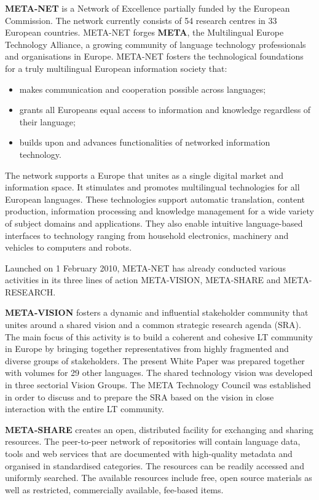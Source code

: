 \begin{multicols}{2}

\textbf{META-NET} is a Network of Excellence partially funded by the
European Commission. The network currently consists of 54 research
centres in 33 European countries. META-NET forges \textbf{META}, the
Multilingual Europe Technology Alliance, a growing community of
language technology professionals and organisations in Europe.
META-NET fosters the technological foundations for a truly
multilingual European information society that:
\begin{itemize}
\item	makes communication and cooperation possible across languages;
\item grants all Europeans equal access to information and knowledge
  regardless of their language;
\item builds upon and advances functionalities of networked
  information technology.
\end{itemize}

The network supports a Europe that unites as a single digital market
and information space. It stimulates and promotes multilingual
technologies for all European languages. These technologies support
automatic translation, content production, information processing and
knowledge management for a wide variety of subject domains and
applications. They also enable intuitive language-based interfaces to
technology ranging from household electronics, machinery and vehicles
to computers and robots.

Launched on 1 February 2010, META-NET has already conducted various
activities in its three lines of action META-VISION, META-SHARE and
META-RESEARCH.

\textbf{META-VISION} fosters a dynamic and influential stakeholder
community that unites around a shared vision and a common strategic
research agenda (SRA). The main focus of this activity is to build a
coherent and cohesive LT community in Europe by bringing together
representatives from highly fragmented and diverse groups of
stakeholders. The present White Paper was prepared together with
volumes for 29 other languages. The shared technology vision was
developed in three sectorial Vision Groups. The META Technology
Council was established in order to discuss and to prepare the SRA
based on the vision in close interaction with the entire LT community.

\textbf{META-SHARE} creates an open, distributed facility for
exchanging and sharing resources. The peer-to-peer network of
repositories will contain language data, tools and web services that
are documented with high-quality metadata and organised in
standardised categories. The resources can be readily accessed and
uniformly searched. The available resources include free, open source
materials as well as restricted, commercially available, fee-based
items.


\end{multicols}
